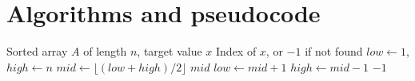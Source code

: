 \documentclass[11pt,a4paper]{article}
\theoremstyle{definition}                   %
\begin{document}

\section{Algorithms and pseudocode}
%
%
%

\begin{algorithm}[H]
    \caption{Binary Search}
    \label{alg:binary-search}
    \begin{algorithmic}[1]
        \Require Sorted array $A$ of length $n$, target value $x$
        \Ensure  Index of $x$, or $-1$ if not found
        \State $low \gets 1$, $high \gets n$
            \State $mid \gets \lfloor (low + high)/2 \rfloor$
                \State \Return $mid$
                \State $low \gets mid + 1$
            \Else
                \State $high \gets mid - 1$
            \EndIf
        \EndWhile
        \State \Return $-1$
    \end{algorithmic}
\end{algorithm}
\end{document}
